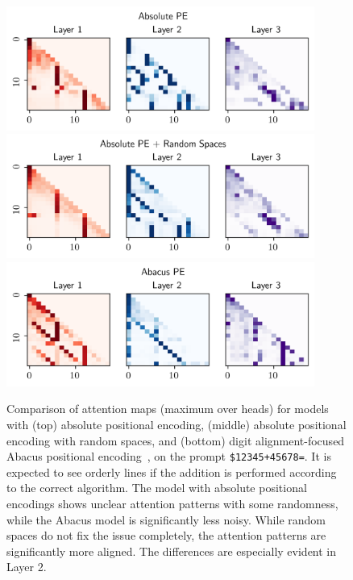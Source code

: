 \begin{figure}[h!]
    \centering
    \includegraphics[width=0.9\textwidth]{fig/attn_map_abs_pe.png}
    \includegraphics[width=0.9\textwidth]{fig/attn_map_abs_pe_random_spaces.png}
    \includegraphics[width=0.9\textwidth]{fig/attn_map_abacus_pe.png}
    \caption{Comparison of attention maps (maximum over heads) for models with (top) absolute positional encoding, (middle) absolute positional encoding with random spaces, and (bottom) digit alignment-focused Abacus positional encoding~\parencite{mcleish_transformers_2024}, on the prompt \texttt{\$12345+45678=}. It is expected to see orderly lines if the addition is performed according to the correct algorithm. The model with absolute positional encodings shows unclear attention patterns with some randomness, while the Abacus model is significantly less noisy. While random spaces do not fix the issue completely, the attention patterns are significantly more aligned. The differences are especially evident in Layer 2.}
    \label{fig:digit_align_attn_maps}
\end{figure}


